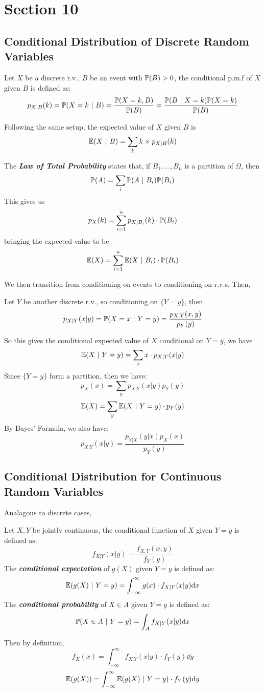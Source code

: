 \section{Section 10}
\subsection{Conditional Distribution of Discrete Random Variables}
\begin{definition}
    Let $X$ be a discrete r.v., $B$ be an event with $\mathbb{P}(B) > 0$, the conditional p.m.f of $X$ given $B$ is defined as:
    $$p_{X|B}(k) = \mathbb{P}(X = k \ | \ B) = \frac{\mathbb{P}(X = k, B)}{\mathbb{P}(B)} = \frac{\mathbb{P}(B \ | \ X = k)\mathbb{P}(X = k)}{\mathbb{P}(B)}$$
\end{definition}
\begin{definition}
    Following the same setup, the expected value of $X$ given $B$ is
    $$\mathbb{E}(X \ | \ B) = \sum_{k} k \times p_{X | B}(k)$$
\end{definition}
\begin{theorem}
    The \textbf{\textit{Law of Total Probability}} states that, if $B_1, \dots, B_n$ is a partition of $\Omega$, then
    $$\Prob(A) = \sum_{i} \Prob(A \ | \ B_i)\Prob(B_i)$$
    This gives us
    $$p_X(k) = \sum_{i = 1}^{n} p_{X | B_i}(k) \cdot \mathbb{P}(B_i)$$
    bringing the expected value to be
    $$\mathbb{E}(X) = \sum_{i = 1}^{n} \mathbb{E}(X \ | \ B_i) \cdot \mathbb{P}(B_i)$$
\end{theorem}
We then transition from conditioning on events to conditioning on r.v.s. Then,
\begin{definition}
    Let $Y$ be another discrete r.v., so conditioning on $\{Y = y\}$, then
    $$p_{X|Y}(x|y) = \mathbb{P}(X = x \ | \ Y = y) = \frac{p_{X, Y}(x, y)}{p_Y(y)}$$
\end{definition}
So this gives the conditional expected value of $X$ conditional on $Y = y$, we have
$$\mathbb{E}(X \ | \ Y = y) = \sum_{x} x \cdot p_{X|Y}(x|y)$$
Since $\{Y = y\}$ form a partition, then we have:
$$p_X(x) = \sum_{y} p_{X|Y}(x|y) p_Y(y)$$
$$\mathbb{E}(X) = \sum_{y} \mathbb{E}(X \ | \ Y = y) \cdot p_Y(y)$$
By Bayes' Formula, we also have:
$$p_{X|Y}(x|y) = \frac{p_{Y|X}(y|x)p_X(x)}{p_Y(y)}$$

\subsection{Conditional Distribution for Continuous Random Variables}
Analagous to discrete cases, 
\begin{definition}
    Let $X, Y$ be jointly continuous, the conditional function of $X$ given $Y = y$ is defined as:
    $$f_{X|Y}(x|y) = \frac{f_{X, Y}(x, y)}{f_Y(y)}$$
    The \textbf{\textit{conditional expectation}} of $g(X)$ given $Y = y$ is defined as:
    $$\mathbb{E}(g(X) \ | \ Y = y) = \int_{-\infty}^{\infty} g(x) \cdot f_{X|Y}(x|y) \dd x$$
    The \textbf{\textit{conditional probability}} of $X \in A$ given $Y = y$ is defined as:
    $$\mathbb{P}(X \in A \ | \ Y = y) = \int_A f_{X|Y}(x|y) \dd x$$
\end{definition}
Then by definition, 
$$f_X(x) = \int_{-\infty}^{\infty} f_{X|Y}(x|y) \cdot f_Y(y) \dd y$$
$$\mathbb{E}(g(X)) = \int_{-\infty}^{\infty} \mathbb{E}(g(X) \ | \ Y = y) \cdot f_Y(y) \dd y$$

